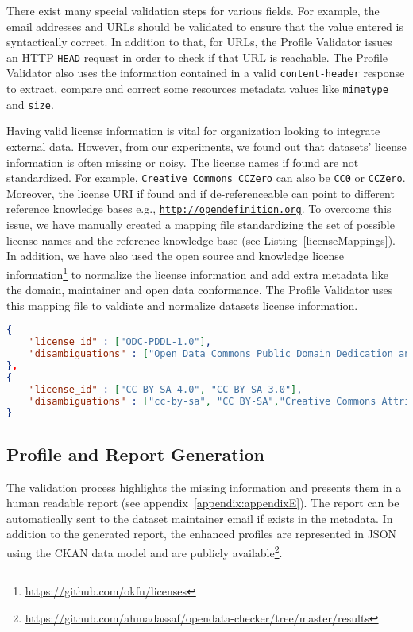 There exist many special validation steps for various fields. For example, the email addresses and URLs should be validated to ensure that the value entered is syntactically correct. In addition to that, for URLs, the Profile Validator issues an HTTP \texttt{HEAD} request in order to check if that URL is reachable. The Profile Validator also uses the information contained in a valid \texttt{content-header} response to extract, compare and correct some resources metadata values like \texttt{mimetype} and \texttt{size}.

Having valid license information is vital for organization looking to integrate external data. However, from our experiments, we found out that datasets' license information is often missing or noisy. The license names if found are not standardized. For example, \texttt{Creative Commons CCZero} can also be \texttt{CC0} or \texttt{CCZero}. Moreover, the license URI if found and if de-referenceable can point to different reference knowledge bases e.g., \texttt{\url{http://opendefinition.org}}. To overcome this issue, we have manually created a mapping file standardizing the set of possible license names and the reference knowledge base (see Listing~\ref{licenseMappings}). In addition, we have also used the open source and knowledge license information\footnote{\url{https://github.com/okfn/licenses}} to normalize the license information and add extra metadata like the domain, maintainer and open data conformance. The Profile Validator uses this mapping file to valdiate and normalize datasets license information.

\begin{lstlisting}[language=json]
{
	"license_id" : ["ODC-PDDL-1.0"],
	"disambiguations" : ["Open Data Commons Public Domain Dedication and License (PDDL)"]
},
{
	"license_id" : ["CC-BY-SA-4.0", "CC-BY-SA-3.0"],
	"disambiguations" : ["cc-by-sa", "CC BY-SA","Creative Commons Attribution Share-Alike"]
}
\end{lstlisting}

\subsection{Profile and Report Generation}
The validation process highlights the missing information and presents them in a human readable report (see appendix~\ref{appendix:appendixE}). The report can be automatically sent to the dataset maintainer email if exists in the metadata. In addition to the generated report, the enhanced profiles are represented in JSON using the CKAN data model and are publicly available\footnote{\url{https://github.com/ahmadassaf/opendata-checker/tree/master/results}}.\\

